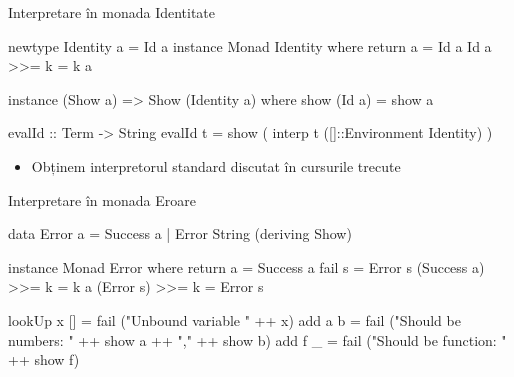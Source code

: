 \documentclass[xcolor=pdftex,romanian,colorlinks]{beamer}
\begin{document}
\begin{frame}[fragile]{Interpretare în monada Identitate}
\begin{asciihs}
newtype Identity a = Id a
instance Monad Identity where
  return a   = Id a
  Id a >>= k = k a

instance (Show a) => Show (Identity a) where
  show (Id a) = show a

evalId :: Term -> String
evalId t = show ( interp t ([]::Environment Identity) )
\end{asciihs}
\begin{itemize}
\item Obținem interpretorul standard discutat în cursurile trecute
\end{itemize}
\end{frame}


\begin{frame}[fragile]{Interpretare în monada Eroare}
\begin{asciihs}
data Error a = Success a | Error String
  (deriving Show)

instance Monad Error where
  return a = Success a
  fail   s = Error s
  (Success a) >>= k = k a
  (Error s)   >>= k = Error s
  
  
lookUp x [] = fail ("Unbound variable " ++ x)
add a b   = fail ("Should be numbers: " ++ show a ++ 
                                    "," ++ show b)
add f _   = fail ("Should be function: " ++ show f)
\end{asciihs}
\end{frame}

\end{document}
